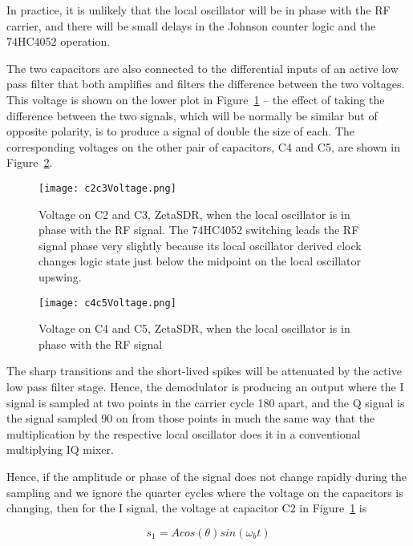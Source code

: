 \documentclass[11pt, twoside]{article}
\begin{document}
In practice, it is unlikely that the local oscillator will be in phase
with the RF carrier, and there will be small delays in the Johnson
counter logic and the 74HC4052 operation.

The two capacitors are also connected to the differential inputs of an
active low pass filter that both amplifies and filters the difference
between the two voltages.  This voltage is shown on the lower plot in
Figure~\ref{figure:C2C3simple} -- the effect of taking the difference
between the two signals, which will be normally be similar but of
opposite polarity, is to produce a signal of double the size of each.
The corresponding voltages on the other pair of capacitors, C4 and C5,
are shown in Figure~\ref{figure:C4C5simple}.

\begin{figure}
  \center
  \captionsetup{width=.8\linewidth}
  \texttt{[image: c2c3Voltage.png]}
  \caption{Voltage on C2 and C3, ZetaSDR, when the local oscillator is
    in phase with the RF signal. The 74HC4052 switching leads the RF
    signal phase very slightly because its local oscillator derived
    clock changes logic state just below the midpoint on the local
    oscillator upswing.  }
  \label{figure:C2C3simple}
\end{figure}


\begin{figure}
  \center
  \captionsetup{width=.8\linewidth}
  \texttt{[image: c4c5Voltage.png]}
  \caption{Voltage on C4 and C5, ZetaSDR, when the local oscillator is
    in phase with the RF signal}
  \label{figure:C4C5simple}
\end{figure}

The sharp transitions and the short-lived spikes will be attenuated by
the active low pass filter stage.  Hence, the demodulator is producing
an output where the I signal is sampled at two points in the carrier
cycle 180{\degree} apart, and the Q signal is the signal sampled
90{\degree} on from those points in much the same way that the
multiplication by the respective local oscillator does it in a
conventional multiplying IQ mixer.

Hence, if the amplitude or phase of the signal does not change
rapidly during the sampling and we ignore the quarter cycles where the
voltage on the capacitors is changing, then for the I signal, the
voltage at capacitor C2  in Figure~\ref{figure:C2C3simple} is

\begin{equation*}
  s_1 = A cos(\theta) sin({\omega_b}t)
\end{equation*}
\end{document}
